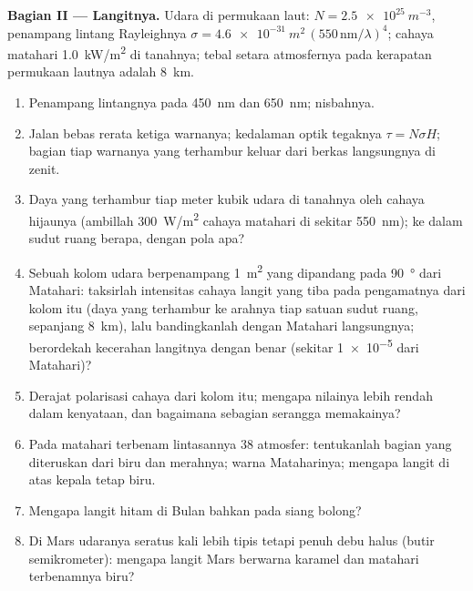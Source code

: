 \begin{problem}
\medskip
\noindent\textbf{Bagian II --- Langitnya.}
Udara di permukaan laut: $N = \qty{2.5e25}{m^{-3}}$, penampang lintang Rayleighnya $\sigma =
\qty{4.6e-31}{m^2}\,(550\,\text{nm}/\lambda)^4$; cahaya matahari \qty{1.0}{kW/m^2} di
tanahnya; tebal setara atmosfernya pada kerapatan permukaan lautnya adalah
\qty{8}{km}.
\begin{enumerate}[resume]
  \item Penampang lintangnya pada \qty{450}{nm} dan \qty{650}{nm}; nisbahnya.
  \item Jalan bebas rerata ketiga warnanya; kedalaman optik tegaknya
        $\tau = N\sigma H$; bagian tiap warnanya yang terhambur keluar dari
        berkas langsungnya di zenit.
  \item Daya yang terhambur tiap meter kubik udara di tanahnya oleh
        cahaya hijaunya (ambillah \qty{300}{W/m^2} cahaya matahari di sekitar
        \qty{550}{nm}); ke dalam sudut ruang berapa, dengan pola apa?
  \item Sebuah kolom udara berpenampang \qty{1}{m^2} yang dipandang pada \qty{90}{\degree} dari
        Matahari: taksirlah intensitas cahaya langit yang tiba pada
        pengamatnya dari kolom itu (daya yang terhambur ke arahnya tiap
        satuan sudut ruang, sepanjang \qty{8}{km}), lalu bandingkanlah dengan
        Matahari langsungnya; berordekah kecerahan langitnya dengan benar
        (sekitar \qty{1e-5}{} dari Matahari)?
  \item Derajat polarisasi cahaya dari kolom itu; mengapa
        nilainya lebih rendah dalam kenyataan, dan bagaimana sebagian serangga memakainya?
  \item Pada matahari terbenam lintasannya $38$ atmosfer: tentukanlah bagian yang diteruskan
        dari biru dan merahnya; warna Mataharinya; mengapa langit di atas kepala tetap
        biru.
  \item Mengapa langit hitam di Bulan bahkan pada siang bolong?
  \item Di Mars udaranya seratus kali lebih tipis tetapi penuh debu
        halus (butir semikrometer): mengapa langit Mars
        berwarna karamel dan matahari terbenamnya biru?
\end{enumerate}


\end{problem}
